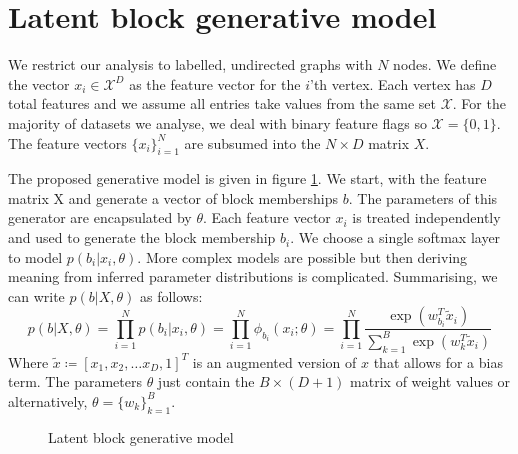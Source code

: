 \documentclass{article}
\newcommand{\Xcal}{\mathcal{X}}
\begin{document}
\section{Latent block generative model}

We restrict our analysis to labelled, undirected graphs with $N$ nodes. We define the vector $x_i \in \Xcal^D$ as the feature vector for the $i$'th vertex. Each vertex has $D$ total features and we assume all entries take values from the same set $\Xcal$. For the majority of datasets we analyse, we deal with binary feature flags so $\Xcal = \{0, 1\}$. The feature vectors $\{x_i\}_{i=1}^{N}$ are subsumed into the $N \times D$ matrix $X$.

The proposed generative model is given in figure \ref{fig:lbgm}. We start, with the feature matrix X and generate a vector of block memberships $b$. The parameters of this generator are encapsulated by $\theta$. Each feature vector $x_i$ is treated independently and used to generate the block membership $b_i$. We choose a single softmax layer to model $p(b_i | x_i, \theta)$. More complex models are possible but then deriving meaning from inferred parameter distributions is complicated. Summarising, we can write $p(b | X, \theta)$ as follows:
%
\begin{equation}
	p(b| X, \theta) = \prod_{i=1}^{N} p(b_i | x_i, \theta) = \prod_{i=1}^{N} \phi_{b_i} (x_i; \theta)
	= \prod_{i=1}^{N} \frac{\exp\left(w_{b_i}^T \tilde{x}_i\right)}{\sum_{k=1}^{B} \exp \left( w_k^T \tilde{x}_i\right)}
\end{equation}
%
Where $\tilde{x} \coloneqq \left[x_1, x_2, \dots x_D, 1\right]^T$ is an augmented version of $x$ that allows for a bias term. The parameters $\theta$ just contain the $B \times (D+1)$ matrix of weight values or alternatively, $\theta = \{w_k\}_{k=1}^{B}$.

\begin{figure}[!h]
	\centering
	\caption{Latent block generative model}
	\label{fig:lbgm}
\end{figure}
\end{document}
